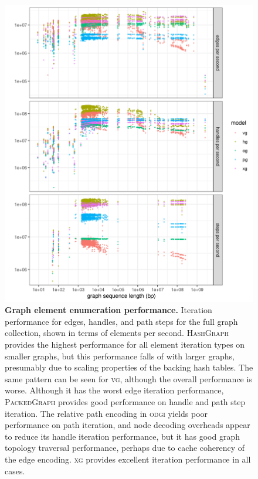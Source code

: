 \documentclass{article}
\begin{document}
\begin{figure}
  \centering
  \includegraphics[width=1.0\textwidth]{figures/iteration_per_second.png}
  \caption{
    \label{fig:prof2}
    \textbf{Graph element enumeration performance.}
    Iteration performance for edges, handles, and path steps for the full graph collection, shown in terms of elements per second.
    \textsc{HashGraph} provides the highest performance for all element iteration types on smaller graphs, but this performance falls of with larger graphs, presumably due to scaling properties of the backing hash tables.
    The same pattern can be seen for \textsc{vg}, although the overall performance is worse.
    Although it has the worst edge iteration performance, \textsc{PackedGraph} provides good performance on handle and path step iteration.
    The relative path encoding in \textsc{odgi} yields poor performance on path iteration, and node decoding overheads appear to reduce its handle iteration performance, but it has good graph topology traversal performance, perhaps due to cache coherency of the edge encoding.
    \textsc{xg} provides excellent iteration performance in all cases.
    }
\end{figure}
\end{document}
